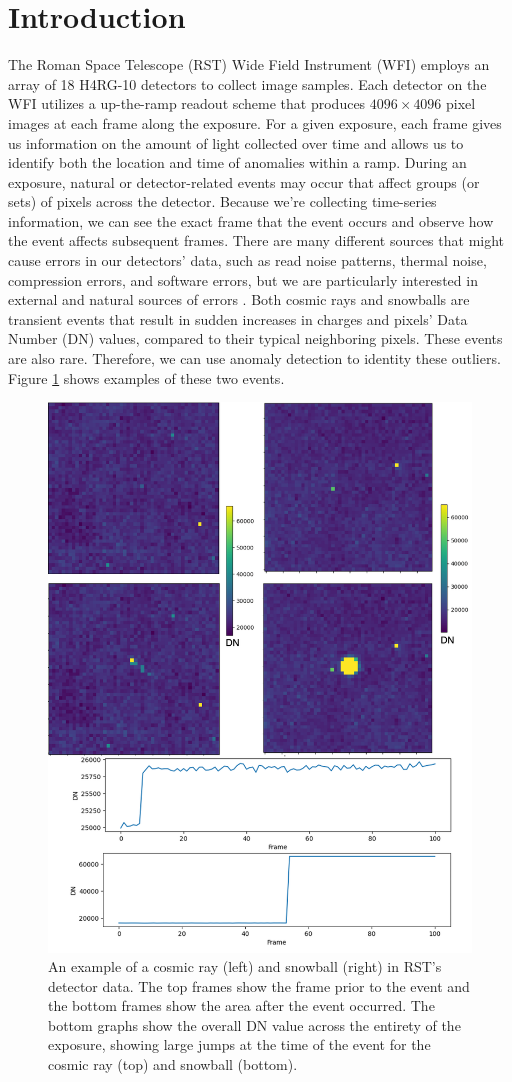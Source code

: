 \section{Introduction}
The Roman Space Telescope (RST) Wide Field Instrument (WFI) employs an array of 18 H4RG-10 detectors to collect image samples.
Each detector on the WFI utilizes a up-the-ramp readout scheme that produces $4096 \times 4096$ pixel images at each frame along the exposure. 
For a given exposure, each frame gives us information on the amount of light collected over time and allows us to identify both the location and time of anomalies within a ramp.
During an exposure, natural or detector-related events may occur that affect groups (or sets) of pixels across the detector. 
Because we're collecting time-series information, we can see the exact frame that the event occurs and observe how the event affects subsequent frames. 
There are many different sources that might cause errors in our detectors' data, such as read noise patterns, thermal noise, compression errors, and software errors, but we are particularly interested in external and natural sources of errors \parencite{cillis2018snowballs}. 
Both cosmic rays and snowballs are transient events that result in sudden increases in charges and pixels’ Data Number (DN) values, compared to their typical neighboring pixels.
These events are also rare.
Therefore, we can use anomaly detection to identity these outliers.
Figure \ref{rst/fig:anomalies} shows examples of these two events.

\begin{figure}
    \centering
    \includegraphics[width=.75\linewidth]{figs/rst/Examples_fixed.png}
    \caption{An example of a cosmic ray (left) and snowball (right) in RST's detector data. The top frames show the frame prior to the event and the bottom frames show the area after the event occurred. The bottom graphs show the overall DN value across the entirety of the exposure, showing large jumps at the time of the event for the cosmic ray (top) and snowball (bottom).}
    \label{rst/fig:anomalies}
\end{figure}

